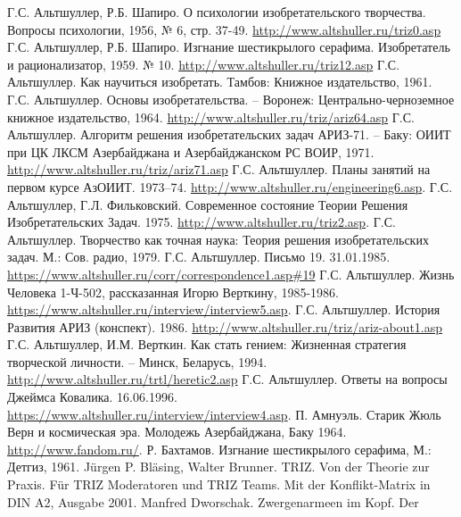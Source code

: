\begin{thebibliography}{xxx}
 Г.С. Альтшуллер, Р.Б. Шапиро. О психологии
  изобретательского творчества.  Вопросы психологии, 1956, № 6, стр. 37-49.
  \url{http://www.altshuller.ru/triz0.asp}
 Г.С. Альтшуллер, Р.Б. Шапиро. Изгнание шестикрылого
  серафима. Изобретатель и рационализатор, 1959. № 10.
  \url{http://www.altshuller.ru/triz12.asp}
 Г.С. Альтшуллер. Как научиться изобретать. Тамбов:
  Книжное издательство, 1961.
 Г.С. Альтшуллер. Основы изобретательства. – Воронеж:
  Центрально-черноземное книжное издательство, 1964.
  \url{http://www.altshuller.ru/triz/ariz64.asp}
 Г.С. Альтшуллер.  Алгоритм решения изобретательских
  задач АРИЗ-71. – Баку: ОИИТ при ЦК ЛКСМ Азербайджана и Азербайджанском РС
  ВОИР, 1971. \url{http://www.altshuller.ru/triz/ariz71.asp}
 Г.С. Альтшуллер. Планы занятий на первом курсе
  АзОИИТ.  1973--74. \url{http://www.altshuller.ru/engineering6.asp}.
 Г.С. Альтшуллер, Г.Л. Фильковский. Современное
  состояние Теории Решения Изобретательских Задач. 1975.
  \url{http://www.altshuller.ru/triz2.asp}.
 Г.С. Альтшуллер. Творчество как точная наука: Теория
  решения изобретательских задач. М.: Сов. радио, 1979.
 Г.С. Альтшуллер. Письмо 19.  31.01.1985.
  \url{https://www.altshuller.ru/corr/correspondence1.asp#19}
 Г.С. Альтшуллер. Жизнь Человека 1-Ч-502, рассказанная
  Игорю Верткину, 1985-1986.
  \url{https://www.altshuller.ru/interview/interview5.asp}.
 Г.С. Альтшуллер.  История Развития АРИЗ (конспект).
  1986.  \url{http://www.altshuller.ru/triz/ariz-about1.asp}
 Г.С. Альтшуллер, И.М. Верткин. Как стать гением:
  Жизненная стратегия творческой личности. -- Минск, Беларусь, 1994.
  \url{http://www.altshuller.ru/trtl/heretic2.asp}
 Г.С. Альтшуллер. Ответы на вопросы Джеймса Ковалика.
  16.06.1996.  \url{https://www.altshuller.ru/interview/interview4.asp}.
 П. Амнуэль. Старик Жюль Верн и космическая эра. Молодежь
  Азербайджана, Баку 1964.  \url{http://www.fandom.ru/}.
 Р. Бахтамов. Изгнание шестикрылого серафима, М.:
  Детгиз, 1961.  
 Jürgen P. Bläsing, Walter Brunner. TRIZ. Von der
  Theorie zur Praxis. Für TRIZ Moderatoren und TRIZ Teams. Mit der
  Konflikt-Matrix in DIN A2, Ausgabe 2001.
 Manfred Dworschak. Zwergenarmeen im Kopf. Der

\end{thebibliography}
